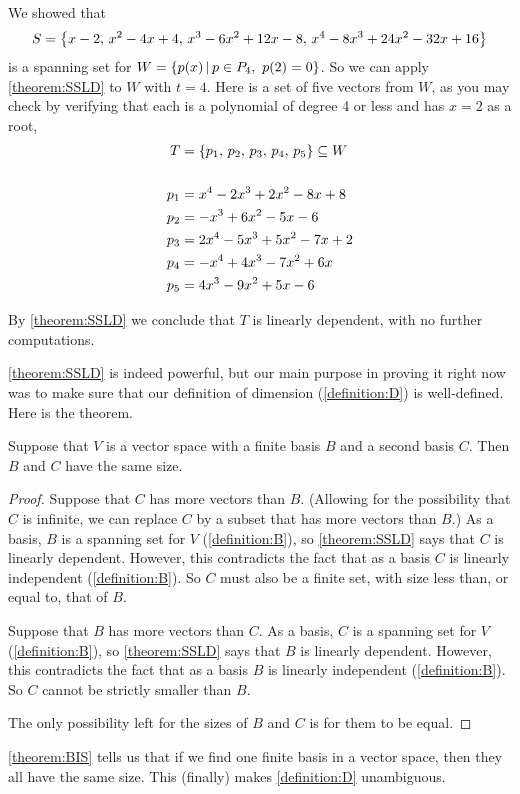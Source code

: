 \documentclass{ximera}
\begin{document}
\begin{example}
  We showed that
  \[
    S=\left\{x-2,\,x^2-4x+4,\,x^3-6x^2+12x-8,\,x^4-8x^3+24x^2-32x+16\right\}
  \]
  is a spanning set for $W=\left\lbrace p(x)\,\middle|\,p\in P_4,\ p(2)=0\right\rbrace$.  So we
  can apply \ref{theorem:SSLD} to $W$ with $t=4$.  Here is a set of
  five vectors from $W$, as you may check by verifying that each is a
  polynomial of degree 4 or less and has $x=2$ as a root,
  \begin{align*}
    T&=\left\{p_1,\,p_2,\,p_3,\,p_4,\,p_5\right\}\subseteq W\\
     &\ \\
    p_1&=x^4-2x^3+2x^2-8x+8\\
    p_2&=-x^3+6x^2-5x-6\\
    p_3&=2x^4-5x^3+5x^2-7x+2\\
    p_4&=-x^4+4x^3-7x^2+6x\\
    p_5&=4x^3-9x^2+5x-6
  \end{align*}
  
  By \ref{theorem:SSLD} we conclude that $T$ is linearly dependent,
  with no further computations.
\end{example}

\ref{theorem:SSLD} is indeed powerful, but our main purpose in proving
it right now was to make sure that our definition of dimension
(\ref{definition:D}) is well-defined.  Here is the theorem.

\begin{theorem}
  \label{theorem:BIS}

  Suppose that $V$ is a vector space with a finite basis $B$ and a
  second basis $C$.  Then $B$ and $C$ have the same size.

  \begin{proof}
    Suppose that $C$ has more vectors than $B$.  (Allowing for the
    possibility that $C$ is infinite, we can replace $C$ by a subset
    that has more vectors than $B$.)  As a basis, $B$ is a spanning
    set for $V$ (\ref{definition:B}), so \ref{theorem:SSLD} says that
    $C$ is linearly dependent.  However, this contradicts the fact
    that as a basis $C$ is linearly independent (\ref{definition:B}).
    So $C$ must also be a finite set, with size less than, or equal
    to, that of $B$.

    Suppose that $B$ has more vectors than $C$.  As a basis, $C$ is a
    spanning set for $V$ (\ref{definition:B}), so \ref{theorem:SSLD}
    says that $B$ is linearly dependent.  However, this contradicts
    the fact that as a basis $B$ is linearly independent
    (\ref{definition:B}).  So $C$ cannot be strictly smaller than $B$.

    The only possibility left for the sizes of $B$ and $C$ is for them
    to be equal.
  \end{proof}
\end{theorem}

\ref{theorem:BIS} tells us that if we find one finite basis in a
vector space, then they all have the same size.  This (finally) makes
\ref{definition:D} unambiguous.
\end{document}
